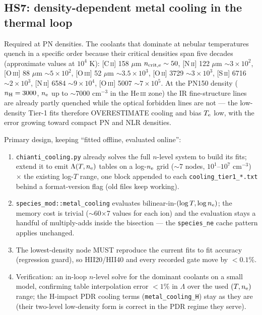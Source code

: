 \documentclass[english,a4paper]{my_memo}
\newcommand{\code}[1]{\texttt{#1}}
\newcommand{\HeIII}{He\,\textsc{iii}}
\newcommand{\Te}{T_{\rm e}}
\newcommand{\nelec}{n_{\rm e}}
\begin{document}
\subsection{HS7: density-dependent metal cooling in the thermal loop}

Required at PN densities.  The coolants that dominate at nebular
temperatures quench in a specific order because their critical
densities span five decades (approximate values at $10^4$ K):
[C\,\textsc{ii}] 158 $\mu$m $n_{\rm crit,e}\sim50$,
[N\,\textsc{ii}] 122 $\mu$m $\sim3\times10^2$,
[O\,\textsc{iii}] 88 $\mu$m $\sim5\times10^2$,
[O\,\textsc{iii}] 52 $\mu$m $\sim3.5\times10^3$,
[O\,\textsc{ii}] 3729 $\sim3\times10^3$,
[S\,\textsc{ii}] 6716 $\sim2\times10^3$,
[N\,\textsc{ii}] 6584 $\sim9\times10^4$,
[O\,\textsc{iii}] 5007 $\sim7\times10^5$.  At the PN150 density
($n_{\rm H}=3000$, $\nelec$ up to $\sim$7000 cm$^{-3}$ in the \HeIII{}
zone) the IR fine-structure lines are already partly quenched while the
optical forbidden lines are not --- the low-density Tier-1 fits
therefore OVERESTIMATE cooling and bias $\Te$ low, with the error
growing toward compact PN and NLR densities.

Primary design, keeping ``fitted offline, evaluated online'':

\begin{enumerate}[leftmargin=2em]
\item \code{chianti\_cooling.py} already solves the full $n$-level
  system to build its fits; extend it to emit
  $\Lambda(T,\nelec)$ tables on a log-$\nelec$ grid ($\sim$7 nodes,
  $10^1$--$10^7$ cm$^{-3}$) $\times$ the existing log-$T$ range, one
  block appended to each \code{cooling\_tier1\_*.txt} behind a
  format-version flag (old files keep working).
\item \code{species\_mod::metal\_cooling} evaluates
  bilinear-in-$(\log T,\log\nelec)$; the memory cost is trivial
  ($\sim$60$\times$7 values for each ion) and the evaluation stays a
  handful of multiply-adds inside the bisection --- the
  \code{species\_ne} cache pattern applies unchanged.
\item The lowest-density node MUST reproduce the current fits to fit
  accuracy (regression guard), so HII20/HII40 and every recorded gate
  move by $<0.1\%$.
\item Verification: an in-loop $n$-level solve for the dominant
  coolants on a small model, confirming table interpolation error
  $<1\%$ in $\Lambda$ over the used $(T,\nelec)$ range; the H-impact
  PDR cooling terms (\code{metal\_cooling\_H}) stay as they are (their
  two-level low-density form is correct in the PDR regime they serve).
\end{enumerate}
\end{document}
